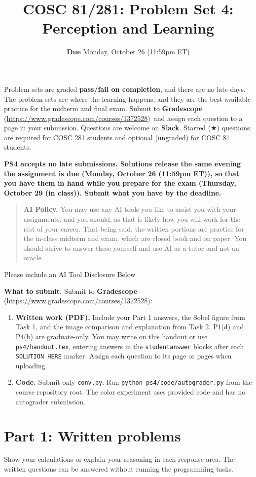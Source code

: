 \documentclass[11pt]{article}
\title{\textbf{\coursenumber:} #1}
\author{\textbf{Due} #2\\
  }
\date{}
\newcommand{\dgreen}[1]{\textcolor{DartmouthGreen}{#1}}
\newcommand{\dgbf}[1]{\textbf{\dgreen{#1}}}      %
\newcommand{\coursenumber}{COSC 81/281}
\newcommand{\gradescopelink}{\textbf{Gradescope} (\url{https://www.gradescope.com/courses/1372528})}
\newcommand{\examDate}{Thursday, October 29 (in class)}
\newcommand{\psFourDue}{Monday, October 26 (11:59pm ET)}
\providecommand{\tightlist}{\setlength{\itemsep}{0pt}\setlength{\parskip}{0pt}}
\DeclareRobustCommand{\callout}[2][gray!10]{%
  \begin{tcolorbox}[left=8pt, arc=0pt, outer arc=0pt,
                    colframe=#1, colback=#1, coltext=black]#2\end{tcolorbox}}
\newcommand{\pstitle}[2]{%
  \title{\textbf{\coursenumber:} #1}
  \author{\textbf{Due} #2\\
  }
  \date{}
}
\newcommand{\coursenotice}{%
  \callout{Problem sets are graded \textbf{pass/fail on completion}, and
  there are no late days. The problem sets are where the learning happens,
  and they are the best available practice for the midterm and final exam.
  Submit to \gradescopelink\ and assign each question to a page in your
  submission. Questions are welcome on \dgbf{Slack}. Starred ($\bigstar$)
  questions are required for COSC 281 students and optional (ungraded) for
  COSC 81 students.}}
\begin{document}
\pstitle{Problem Set 4: Perception and Learning}{\psFourDue}
\maketitle

\coursenotice

\textbf{PS4 accepts no late submissions. Solutions release the same evening
the assignment is due (\psFourDue), so that you have them in hand while you
prepare for the exam (\examDate). Submit what you have by the deadline.}

\begin{quote}\small\textbf{AI Policy.} You may use any AI tools you like to assist you with your assignments, and you should, as that is likely how you will work for the rest of your career.
That being said, the written portions are practice for the in-class midterm and exam, which are closed book and on paper. You should strive to answer these yourself and use AI as a tutor and not an oracle.
\end{quote}

\callout{Please include an AI Tool Disclosure Below \vspace{50pt}}

\raggedbottom
\Needspace{5cm}
\textbf{What to submit.} Submit to \gradescopelink:
\begin{enumerate}\tightlist
\item \textbf{Written work (PDF).} Include your Part 1 answers, the Sobel
figure from Task 1, and the image comparison and explanation from Task 2.
P1(d) and P4(b) are graduate-only. You may write on this
handout or use \texttt{ps4/handout.tex}, entering answers in the
\texttt{studentanswer} blocks after each \texttt{SOLUTION HERE} marker.
Assign each question to its page or pages when uploading.
\item \textbf{Code.} Submit only \texttt{conv.py}. Run
\texttt{python ps4/code/autograder.py} from the course repository root.
The color experiment uses provided code and has no autograder submission.
\end{enumerate}
\clearpage
\section{Part 1: Written problems}
Show your calculations or explain your reasoning in each response area.
The written questions can be answered without running the programming tasks.
\end{document}
